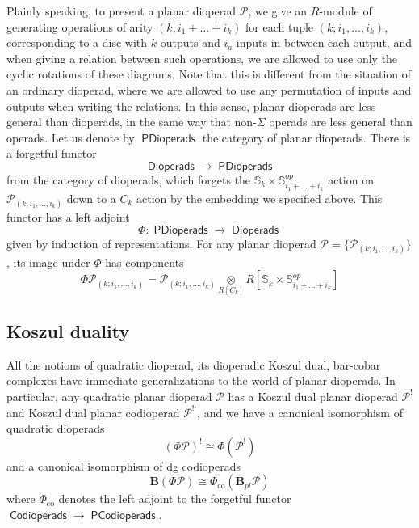 \documentclass[11pt,a4paper]{amsart}
\renewcommand{\SS}{\ensuremath{\mathbb{S}}}
\newcommand{\scrP}{\mathscr{P}}
\newcommand{\Diop}{\mathop{\mathsf{Dioperads}}\nolimits}
\newcommand{\PDiop}{\mathop{\mathsf{PDioperads}}\nolimits}
\newcommand{\Codiop}{\mathop{\mathsf{Codioperads}}\nolimits}
\newcommand{\PCodiop}{\mathop{\mathsf{PCodioperads}}\nolimits}
\newcommand{\antish}{\ensuremath{\mbox{!`}}}
\theoremstyle{definition}
\begin{document}
Plainly speaking, to present a planar dioperad $\scrP$, we give an $R$-module of generating operations of arity $(k;i_1 + \dots + i_k)$ for each tuple $(k;i_1,\dots,i_k)$, corresponding to a disc with $k$ outputs and $i_a$ inputs in between each output, and when giving a relation between such operations, we are allowed to use only the cyclic rotations of these diagrams. Note that this is different from the situation of an ordinary dioperad, where we are allowed to use any permutation of inputs and outputs when writing the relations. In this sense, planar dioperads are less general than dioperads, in the same way that non-$\Sigma$ operads are less general than operads. Let us denote by $\PDiop$ the category of planar dioperads. There is a forgetful functor
\[ \Diop \to \PDiop \]
from the category of dioperads, which forgets the $\SS_k \times \SS_{i_1+\dots+i_k}^{op}$ action on $\scrP_{(k;i_1,\dots,i_k)}$ down to a $C_k$ action by the embedding we specified above. This functor has a left adjoint
\[ \Phi \colon \PDiop \to \Diop \]
given by induction of representations. For any planar dioperad $\scrP = \{\scrP_{(k;i_1,\dots,i_k)}\}$, its image under $\Phi$ has components
\[ \Phi \scrP_{(k;i_1,\dots,i_k)} = \scrP_{(k;i_1,\dots,i_k)} \underset{R[C_k]}{\otimes} R\left[\SS_k \times  \SS_{i_1+\dots+i_k}^{op}\right] \] %

\subsection{Koszul duality}
All the notions of quadratic dioperad, its dioperadic Koszul dual, bar-cobar complexes have immediate generalizations to the world of planar dioperads. In particular, any quadratic planar dioperad $\scrP$ has a Koszul dual planar dioperad $\scrP^!$ and Koszul dual planar codioperad $\scrP^{\antish}$, and we have a canonical isomorphism of quadratic dioperads
\[ (\Phi \scrP)^! \cong \Phi (\scrP^!) \]
and a canonical isomorphism of dg codioperads
\[ \mathbf{B}(\Phi \scrP) \cong \Phi_\mathrm{co}(\mathbf{B}_{pl} \scrP) \]
where $\Phi_\mathrm{co}$ denotes the left adjoint to the forgetful functor $\Codiop \to \PCodiop$. 
\end{document}
